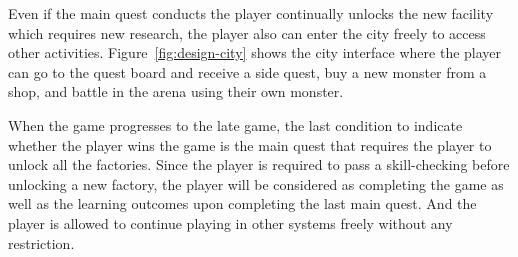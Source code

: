 \documentclass[12pt,oneside,openright,a4paper]{cpe-english-project}
\begin{document}
\begin{itemize}
Even if the main quest conducts the player continually unlocks the new facility which requires new research, the player also can enter the city freely to access other activities. Figure~\ref{fig:design-city} shows the city interface where the player can go to the quest board and receive a side quest, buy a new monster from a shop, and battle in the arena using their own monster.


\begin{minipage}[c]{\textwidth}\centering
{}
\label{fig:design-city}
\end{minipage}

When the game progresses to the late game, the last condition to indicate whether the player wins the game is the main quest that requires the player to unlock all the factories. Since the player is required to pass a skill-checking before unlocking a new factory, the player will be considered as completing the game as well as the learning outcomes upon completing the last main quest. And the player is allowed to continue playing in other systems freely without any restriction.


\end{itemize}
\end{document}
